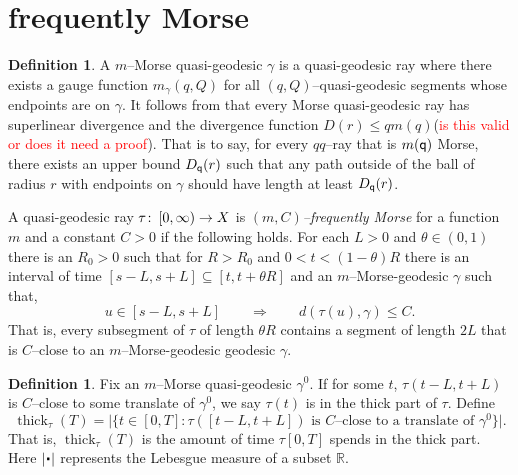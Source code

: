 \documentclass{amsart}
\newtheorem{lem}[thm]{Lemma}
\theoremstyle{definition}
\newtheorem{defn}[thm]{Definition}
\theoremstyle{remark}
\newcommand{\RR}{\mathbb{R}}
\newcommand{\from}{\colon\thinspace}
\newcommand{\thick}{\ensuremath{\operatorname{thick}}\xspace}
\newcommand{\param}{{\mathchoice{\mkern1mu\mbox{\raise2.2pt\hbox{$
  \centerdot$}}
  \mkern1mu}{\mkern1mu\mbox{\raise2.2pt\hbox{$\centerdot$}}\mkern1mu}{
  \mkern1.5mu\centerdot\mkern1.5mu}{\mkern1.5mu\centerdot\mkern1.5mu}}}
\newcommand{\qq}{{\sf q}}
\begin{document}

\iffalse
\section{frequently Morse}
\begin{defn}
A $m$--Morse quasi-geodesic $\gamma$ is a quasi-geodesic ray where there exists a gauge function $m_\gamma(q, Q)$ for all $(q, Q)$--quasi-geodesic segments whose endpoints are on $\gamma$. It follows from \cite{Cashen-Hume} that every Morse quasi-geodesic ray has superlinear divergence and the divergence function $D(r) \leq q m(q)$(\textcolor{red}{is this valid or does it need a proof}). That is to say, for every $qq$--ray that is $m(\qq)$ Morse, there exists an upper bound $D_{\qq}(r)$ such that any path outside of the ball of radius $r$ with endpoints on $\gamma$ should have length at least  $D_{\qq}(r)$.

A quasi-geodesic ray $\tau \from [0, \infty) \to X$ is \emph{$(m,C)$--frequently Morse} for a function $m$ and a constant $C>0$ 
if the following holds. For each $L>0$ and $\theta\in (0,1)$ there is an $R_0>0$ such that for $R>R_0$ and $0 < t < (1-\theta)R$ there is an interval 
of time $[s-L, s+L] \subseteq[t, t+ \theta R]$ and an $m$--Morse-geodesic $\gamma$ such that, 
\[
u \in [s-L , s+L]
\qquad\Longrightarrow \qquad
d(\tau(u), \gamma) \leq C. 
\]
That is, every subsegment of $\tau$ of length $\theta R$ contains a segment of length $2L$ that is $C$--close to
an $m$--Morse-geodesic geodesic $\gamma$. 
\end{defn}

\begin{defn}
Fix an $m$--Morse quasi-geodesic $\gamma^0$. 
If for some $t$, $\tau(t-L,t+L)$ is $C$--close to some 
translate of $\gamma^0$, we say $\tau(t)$ is in the thick part of $\tau$.  
Define 
\[
\thick_\tau(T) = \Big|  \big\{t\in [0,T]: \text{$\tau([t-L,t+L])$ is $C$--close  }
\text{to a translate of $\gamma^0$}\big\} \Big|.
\]
That is, $\thick_\tau(T)$ is the amount of time $\tau[0,T]$ spends in the thick part. 
Here $| \param |$ represents the Lebesgue measure of a subset $\RR$. 
\end{defn}
\end{document}
